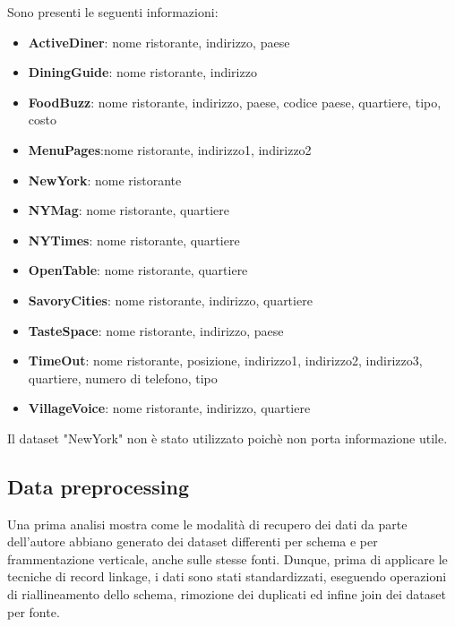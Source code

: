 \documentclass[a4paper,12pt]{article}
\begin{document}
\noindent Sono presenti le seguenti informazioni: 
\begin{itemize}
\item \textbf{ActiveDiner}: nome ristorante, indirizzo, paese
\item \textbf{DiningGuide}: nome ristorante, indirizzo
\item \textbf{FoodBuzz}: nome ristorante, indirizzo, paese, codice paese, quartiere, tipo, costo
\item \textbf{MenuPages}:nome ristorante, indirizzo1, indirizzo2
\item \textbf{NewYork}: nome ristorante
\item \textbf{NYMag}: nome ristorante, quartiere
\item \textbf{NYTimes}: nome ristorante, quartiere
\item \textbf{OpenTable}: nome ristorante, quartiere
\item \textbf{SavoryCities}: nome ristorante, indirizzo, quartiere
\item \textbf{TasteSpace}: nome ristorante, indirizzo, paese
\item \textbf{TimeOut}: nome ristorante, posizione, indirizzo1, indirizzo2, indirizzo3, quartiere, numero di telefono, tipo
\item \textbf{VillageVoice}: nome ristorante, indirizzo, quartiere
\end{itemize}

\noindent Il dataset "NewYork" non è stato utilizzato poichè non porta informazione utile.

\subsection{Data preprocessing} 
Una prima analisi mostra come le modalità di recupero dei dati da parte dell'autore abbiano generato dei dataset differenti per schema e per frammentazione verticale, anche sulle stesse fonti. Dunque, prima di applicare le tecniche di record linkage, i dati sono stati standardizzati, eseguendo operazioni di riallineamento dello schema, rimozione dei duplicati ed infine join dei dataset per fonte.\\
\end{document}

